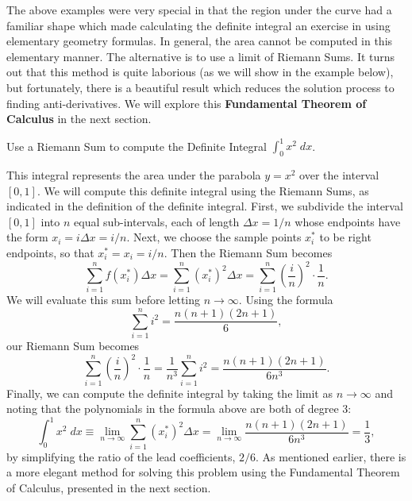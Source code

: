\documentclass{ximera}
\begin{document}
The above examples were very special in that the region under the curve had a familiar shape which
made calculating the definite integral an exercise in using elementary geometry formulas. 
In general, the area cannot be computed in this elementary manner.  
The alternative is to use a limit of Riemann Sums.  It turns out that this method is quite laborious (as we will show in the example below), but 
fortunately, there is a beautiful result which reduces the solution process to finding anti-derivatives. 
We will explore this \textbf{Fundamental Theorem of Calculus} in the next section.

\begin{example}[example 5]
Use a Riemann Sum to compute the Definite Integral $\displaystyle{\int_0^1 x^2 \; dx}$.

This integral represents the area under the parabola $y = x^2$ over the interval $[0,1]$. 
We will compute this definite integral using the Riemann Sums, as indicated in the definition of the definite integral.
First, we subdivide the interval $[0,1]$ into $n$ equal sub-intervals, each of length 
$\Delta x= 1/n$ whose endpoints have the form $x_i = i\Delta x = i/n$.  Next, we choose the sample points $x_i^*$
to be right endpoints, so that $x_i^* = x_i = i/n$. Then the Riemann Sum becomes
\[
\sum_{i = 1}^n f(x_i^*) \Delta x =  \sum_{i = 1}^n \left(x_i^*\right)^2 \Delta x = \sum_{i = 1}^n \left(\frac{i}{n}\right)^2 \cdot \frac{1}{n}.
\]
We will evaluate this sum before letting $n\to \infty$. Using the formula
\[
\sum_{i = 1}^n i^2 = \frac{n(n+1)(2n+1)}{6},
\]
our Riemann Sum becomes
\[
\sum_{i = 1}^n \left(\frac{i}{n}\right)^2 \cdot \frac{1}{n} = \frac{1}{n^3} \sum_{i = 1}^n i^2 = \frac{n(n+1)(2n+1)}{6n^3}.
\]
Finally, we can compute the definite integral by taking the limit as $n \to \infty$ and noting that the polynomials in the formula above are both of degree 3:
\[
\int_0^1 x^2 \; dx \equiv \lim_{n \to \infty} \sum_{i = 1}^n \left(x_i^*\right)^2 \Delta x = \lim_{n \to \infty} \frac{n(n+1)(2n+1)}{6n^3} = \frac{1}{3},
\]
by simplifying the ratio of the lead coefficients, $2/6$.
As mentioned earlier, there is a more elegant method for solving this problem using the Fundamental Theorem of Calculus, presented in the next section.

\end{example}
\end{document}
